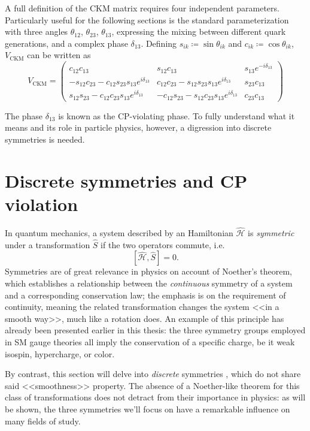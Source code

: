 A full definition of the CKM matrix requires four independent parameters.
Particularly useful for the following sections is the standard parameterization with three angles $\theta_{12}$, $\theta_{23}$, $\theta_{13}$, expressing the mixing between different quark generations, and a complex phase $\delta_{13}$.
Defining $s_{ik} \coloneqq \sin\theta_{ik}$ and $c_{ik} \coloneqq \cos\theta_{ik}$, $V_\text{CKM}$ can be written as
\begin{equation}
	V_\text{CKM}
	=
	\begin{pmatrix}
		c_{12} c_{13}
		&
		s_{12} c_{13}
		&
		s_{13} e^{-i\delta_{13}}
		\\
		- s_{12} c_{23} - c_{12} s_{23} s_{13} e^{i\delta_{13}}
		&
		c_{12} c_{23} - s_{12} s_{23} s_{13} e^{i\delta_{13}}
		&
		s_{23} c_{13}
		\\
		s_{12} s_{23} - c_{12} c_{23} s_{13} e^{i\delta_{13}}
		&
		-c_{12} s_{23} - s_{12} c_{23} s_{13} e^{i\delta_{13}}
		&
		c_{23} c_{13}
	\end{pmatrix}	
	\label{eq:CKM-matrix-parameterization}
\end{equation}

The phase $\delta_{13}$ is known as the CP-violating phase. To fully understand what it means and its role in particle physics, however, a digression into discrete symmetries is needed.

\section{Discrete symmetries and CP violation}
\label{sec:discrete}
In quantum mechanics, a system described by an Hamiltonian $\hat{\mathcal{H}}$ is \textit{symmetric} under a transformation $\hat{S}$ if the two operators commute, i.e.
\begin{equation}
\left[ \hat{\mathcal{H}}, \hat{S} \right] = 0.
\end{equation}
Symmetries are of great relevance in physics on account of Noether's theorem, which establishes a relationship between the \textit{continuous} symmetry of a system and a corresponding conservation law;
the emphasis is on the requirement of continuity, meaning the related transformation changes the system <<in a smooth way>>, much like a rotation does.
An example of this principle has already been presented earlier in this thesis:
the three symmetry groups employed in SM gauge theories all imply the conservation of a specific charge, be it weak isospin, hypercharge, or color.

By contrast, this section will delve into \textit{discrete} symmetries \cite{discrete}, which do not share said <<smoothness>> property.
The absence of a Noether-like theorem for this class of transformations does not detract from their importance in physics:
as will be shown, the three symmetries we'll focus on have a remarkable influence on many fields of study.

